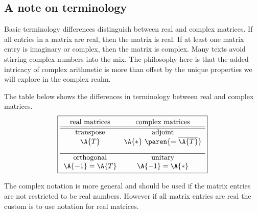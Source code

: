 \subsection{A note on terminology}
Basic terminology differences distinguish between real and complex matrices. If all entries in a matrix are real, then the matrix is real. If at least one matrix entry is imaginary or complex, then the matrix is complex. Many texts avoid stirring complex numbers into the mix. The philosophy here is that the added intricacy of complex arithmetic is more than offset by the unique properties we will explore in the complex realm.

The table below shows the differences in terminology between real and complex matrices.
\begin{equation}
\boxed{
\begin{array}{cc}
  \text{real matrices} & \text{complex matrices} \\\hline\hline
  \text{transpose} & \text{adjoint} \\
  \A{T} & \A{*} \  \paren{= \overline{\A{T}}} \\[10pt]\hline
  \text{orthogonal} & \text{unitary} \\
  \A{-1}=\A{T} & \A{-1}=\A{*}
\end{array}
}
\end{equation}

The complex notation is more general and should be used if the matrix entries are not restricted to be real numbers. However if all matrix entries are real the custom is to use notation for real matrices. 

\endinput